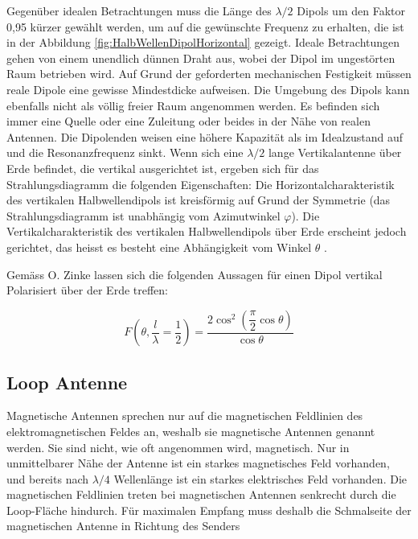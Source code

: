 Gegenüber idealen Betrachtungen muss die Länge des $\lambda /2$ Dipols um den Faktor 0,95
kürzer gewählt werden, um auf die gewünschte Frequenz zu erhalten, die ist in der Abbildung \ref{fig:HalbWellenDipolHorizontal} gezeigt.
Ideale Betrachtungen gehen von einem unendlich dünnen Draht aus, wobei der Dipol im
ungestörten Raum betrieben wird. Auf Grund der geforderten mechanischen Festigkeit
müssen reale Dipole eine gewisse Mindestdicke aufweisen. Die Umgebung des Dipols kann
ebenfalls nicht als völlig freier Raum angenommen werden. Es befinden sich immer eine Quelle oder eine Zuleitung oder beides in der Nähe von realen Antennen. Die Dipolenden weisen eine höhere Kapazität als im Idealzustand auf und die Resonanzfrequenz sinkt. Wenn sich eine $\lambda /2$ lange Vertikalantenne über Erde befindet, die vertikal ausgerichtet ist, ergeben sich für das Strahlungsdiagramm die folgenden Eigenschaften: 
Die Horizontalcharakteristik des vertikalen Halbwellendipols ist kreisförmig auf Grund der Symmetrie (das Strahlungsdiagramm ist unabhängig vom Azimutwinkel $\varphi$). Die Vertikalcharakteristik des vertikalen Halbwellendipols über Erde erscheint jedoch gerichtet, das heisst es besteht eine Abhängigkeit vom Winkel $\theta$ . 

Gemäss O. Zinke %
 lassen sich die folgenden Aussagen für einen Dipol vertikal Polarisiert über der Erde treffen:


\begin{equation}\label{eq:FDipolTheat}
F(\theta,\frac{l}{\lambda}=\dfrac{1}{2})=\dfrac{2\cos^{2}(\dfrac{\pi}{2}\cos\theta)}{\cos\theta}
\end{equation}

\subsection{Loop Antenne}
Magnetische Antennen sprechen nur auf die magnetischen Feldlinien des elektromagnetischen Feldes an, weshalb sie magnetische Antennen genannt werden. Sie sind nicht, wie oft angenommen wird, magnetisch. Nur in unmittelbarer Nähe der Antenne ist ein starkes magnetisches Feld vorhanden, und bereits nach $\lambda/4$ Wellenlänge ist ein starkes elektrisches Feld vorhanden. Die magnetischen Feldlinien treten bei magnetischen Antennen senkrecht durch die Loop-Fläche hindurch. Für maximalen Empfang muss deshalb die Schmalseite der magnetischen Antenne in Richtung des Senders

